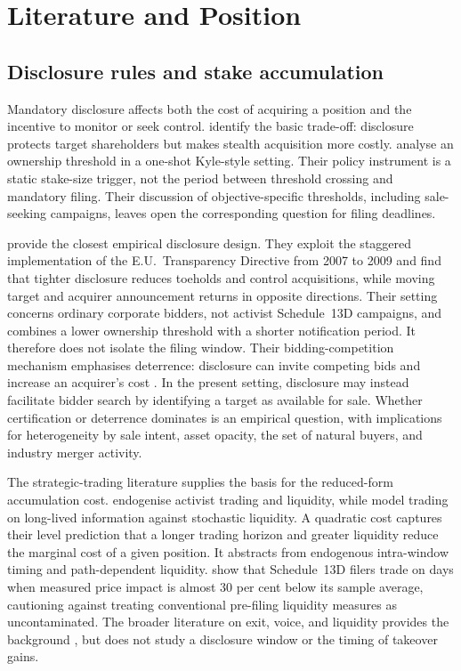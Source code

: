 \section{Literature and Position}
\label{sec:lit}

\subsection{Disclosure rules and stake accumulation}
\label{sec:lit-threshold}

Mandatory disclosure affects both the cost of acquiring a position and the
incentive to monitor or seek control. \textcite{grossmanhart1980disclosure}
identify the basic trade-off: disclosure protects target shareholders but makes
stealth acquisition more costly. \textcite{ordonezcalafibernhardt2022} analyse
an ownership threshold in a one-shot Kyle-style setting. Their policy instrument
is a static stake-size trigger, not the period between threshold crossing and
mandatory filing. Their discussion of objective-specific thresholds, including
sale-seeking campaigns, leaves open the corresponding question for filing
deadlines.

\textcite{bonettiduroormazabal2020} provide the closest empirical disclosure
design. They exploit the staggered implementation of the E.U.\ Transparency
Directive from 2007 to 2009 and find that tighter disclosure reduces toeholds
and control acquisitions, while moving target and acquirer announcement returns
in opposite directions. Their setting concerns ordinary corporate bidders, not
activist Schedule~13D campaigns, and combines a lower ownership threshold with a
shorter notification period. It therefore does not isolate the filing window.
Their bidding-competition mechanism emphasises deterrence: disclosure can invite
competing bids and increase an acquirer's cost \parencite{fishman1988}. In the
present setting, disclosure may instead facilitate bidder search by identifying
a target as available for sale. Whether certification or deterrence dominates
is an empirical question, with implications for heterogeneity by sale intent,
asset opacity, the set of natural buyers, and industry merger activity.

The strategic-trading literature supplies the basis for the reduced-form
accumulation cost. \textcite{back2018} endogenise activist trading and liquidity,
while \textcite{collindufresnefos2016} model trading on long-lived information
against stochastic liquidity. A quadratic cost captures their level prediction
that a longer trading horizon and greater liquidity reduce the marginal cost of
a given position. It abstracts from endogenous intra-window timing and
path-dependent liquidity. \textcite{collindufresnefos2015} show that Schedule~13D
filers trade on days when measured price impact is almost 30 per cent below its
sample average, cautioning against treating conventional pre-filing liquidity
measures as uncontaminated. The broader literature on exit, voice, and liquidity
provides the background \parencite{maug1998,kahnwinton1998,edmansfangzur2013,
edmansholderness2017}, but does not study a disclosure window or the timing of
takeover gains.

